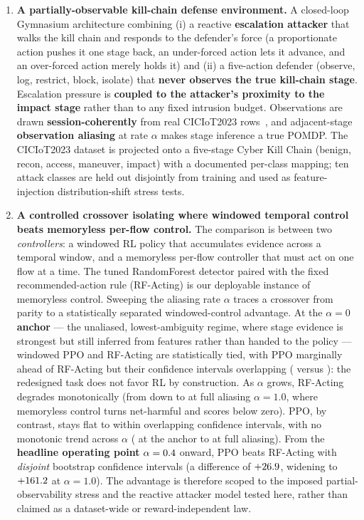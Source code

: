 \begin{enumerate}
    \item \textbf{A partially-observable kill-chain defense environment.} A closed-loop Gymnasium architecture combining (i) a reactive \textbf{escalation attacker} that walks the kill chain and responds to the defender's force (a proportionate action pushes it one stage back, an under-forced action lets it advance, and an over-forced action merely holds it) and (ii) a five-action defender (observe, log, restrict, block, isolate) that \textbf{never observes the true kill-chain stage}. Escalation pressure is \textbf{coupled to the attacker's proximity to the impact stage} rather than to any fixed intrusion budget. Observations are drawn \textbf{session-coherently} from real CICIoT2023 rows~\cite{Neto2023}, and adjacent-stage \textbf{observation aliasing} at rate $\alpha$ makes stage inference a true POMDP. The CICIoT2023 dataset is projected onto a five-stage Cyber Kill Chain (benign, recon, access, maneuver, impact) with a documented per-class mapping; ten attack classes are held out disjointly from training and used as feature-injection distribution-shift stress tests.

    \item \textbf{A controlled crossover isolating where windowed temporal control beats memoryless per-flow control.} The comparison is between two \emph{controllers}: a windowed RL policy that accumulates evidence across a temporal window, and a memoryless per-flow controller that must act on one flow at a time. The tuned RandomForest detector paired with the fixed recommended-action rule (RF-Acting) is our deployable instance of memoryless control. Sweeping the aliasing rate $\alpha$ traces a crossover from parity to a statistically separated windowed-control advantage. At the $\alpha=0$ \textbf{anchor} --- the unaliased, lowest-ambiguity regime, where stage evidence is strongest but still inferred from features rather than handed to the policy --- windowed PPO and RF-Acting are statistically tied, with PPO marginally ahead of RF-Acting but their confidence intervals overlapping (\AnchorPPO{} versus \AnchorRF{}): the redesigned task does not favor RL by construction. As $\alpha$ grows, RF-Acting degrades monotonically (from \AnchorRF{} down to \AlphaOneRF{} at full aliasing $\alpha=1.0$, where memoryless control turns net-harmful and scores below zero). PPO, by contrast, stays flat to within overlapping confidence intervals, with no monotonic trend across $\alpha$ (\AnchorPPO{} at the anchor to \AlphaOnePPO{} at full aliasing). From the \textbf{headline operating point} $\alpha=0.4{}$ onward, PPO beats RF-Acting with \emph{disjoint} bootstrap confidence intervals (a difference of $+26.9{}$, widening to $+161.2{}$ at $\alpha=1.0$). The advantage is therefore scoped to the imposed partial-observability stress and the reactive attacker model tested here, rather than claimed as a dataset-wide or reward-independent law.


\end{enumerate}
